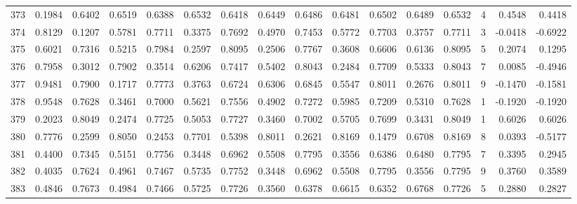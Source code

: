\begin{tabular}{lrrrrrrrrrrrrrrr}
373 &      0.1984 &  0.6402 &  0.6519 &  0.6388 &  0.6532 &  0.6418 &  0.6449 &  0.6486 &  0.6481 &  0.6502 &   0.6489 &     0.6532 &      4 &                    0.4548 &                     0.4418 \\
374 &      0.8129 &  0.1207 &  0.5781 &  0.7711 &  0.3375 &  0.7692 &  0.4970 &  0.7453 &  0.5772 &  0.7703 &   0.3757 &     0.7711 &      3 &                   -0.0418 &                    -0.6922 \\
375 &      0.6021 &  0.7316 &  0.5215 &  0.7984 &  0.2597 &  0.8095 &  0.2506 &  0.7767 &  0.3608 &  0.6606 &   0.6136 &     0.8095 &      5 &                    0.2074 &                     0.1295 \\
376 &      0.7958 &  0.3012 &  0.7902 &  0.3514 &  0.6206 &  0.7417 &  0.5402 &  0.8043 &  0.2484 &  0.7709 &   0.5333 &     0.8043 &      7 &                    0.0085 &                    -0.4946 \\
377 &      0.9481 &  0.7900 &  0.1717 &  0.7773 &  0.3763 &  0.6724 &  0.6306 &  0.6845 &  0.5547 &  0.8011 &   0.2676 &     0.8011 &      9 &                   -0.1470 &                    -0.1581 \\
378 &      0.9548 &  0.7628 &  0.3461 &  0.7000 &  0.5621 &  0.7556 &  0.4902 &  0.7272 &  0.5985 &  0.7209 &   0.5310 &     0.7628 &      1 &                   -0.1920 &                    -0.1920 \\
379 &      0.2023 &  0.8049 &  0.2474 &  0.7725 &  0.5053 &  0.7727 &  0.3460 &  0.7002 &  0.5705 &  0.7699 &   0.3431 &     0.8049 &      1 &                    0.6026 &                     0.6026 \\
380 &      0.7776 &  0.2599 &  0.8050 &  0.2453 &  0.7701 &  0.5398 &  0.8011 &  0.2621 &  0.8169 &  0.1479 &   0.6708 &     0.8169 &      8 &                    0.0393 &                    -0.5177 \\
381 &      0.4400 &  0.7345 &  0.5151 &  0.7756 &  0.3448 &  0.6962 &  0.5508 &  0.7795 &  0.3556 &  0.6386 &   0.6480 &     0.7795 &      7 &                    0.3395 &                     0.2945 \\
382 &      0.4035 &  0.7624 &  0.4961 &  0.7467 &  0.5735 &  0.7752 &  0.3448 &  0.6962 &  0.5508 &  0.7795 &   0.3556 &     0.7795 &      9 &                    0.3760 &                     0.3589 \\
383 &      0.4846 &  0.7673 &  0.4984 &  0.7466 &  0.5725 &  0.7726 &  0.3560 &  0.6378 &  0.6615 &  0.6352 &   0.6768 &     0.7726 &      5 &                    0.2880 &                     0.2827 \\

\end{tabular}
